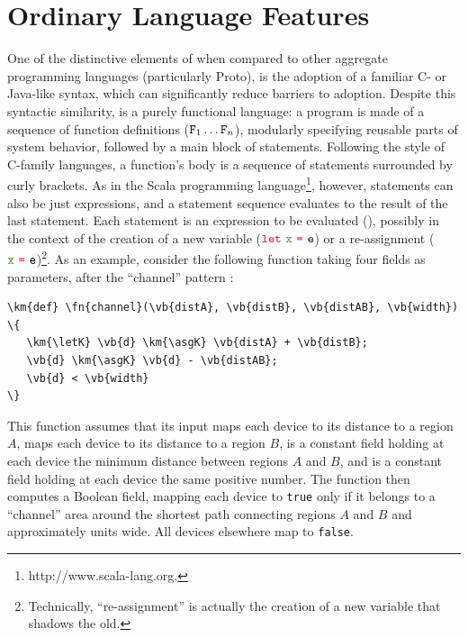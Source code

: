 \documentclass[12pt,a4paper,twoside,openright]{book}
\begin{document}
\section{Ordinary Language Features}

One of the distinctive elements of \protelis{} when compared to other aggregate programming languages (particularly Proto), is the adoption of a familiar C- or Java-like syntax, which can significantly reduce barriers to adoption.
%
Despite this syntactic similarity, \protelis{} is a purely functional language: a program is made of a sequence of function definitions ($\texttt{F}_1\ldots\texttt{F}_n$), modularly specifying reusable parts of system behavior, followed by a main block of statements.
%
Following the style of C-family languages, a function's body is a sequence of statements surrounded by curly brackets.  As in the Scala programming language\footnote{http://www.scala-lang.org.}, however, statements can also be just expressions, and a statement sequence evaluates to the result of the last statement.
%
Each statement is an expression to be evaluated (\e), possibly in the context of the creation of a new variable ($\km{\letK} \vb{\var} \km{\asgK} \e$) or a re-assignment ($\vb{\var} \km{\asgK} \e$)\footnote{Technically, ``re-assignment'' is actually the creation of a new variable that shadows the old.}.
%
As an example, consider the following function taking four fields as parameters, after the ``channel'' pattern \cite{butera}:
\begin{center}
\begin{Verbatim}[samepage=true, frame=single, commandchars=\\\{\}]
\km{def} \fn{channel}(\vb{distA}, \vb{distB}, \vb{distAB}, \vb{width}) \{
   \km{\letK} \vb{d} \km{\asgK} \vb{distA} + \vb{distB};
   \vb{d} \km{\asgK} \vb{d} - \vb{distAB};
   \vb{d} < \vb{width}
\}
\end{Verbatim}
\end{center}
This function assumes that its input \texttt{} maps each device to its distance to a region $A$, \texttt{} maps each device to its distance to a region $B$, \texttt{} is a constant field holding at each device the minimum distance between regions $A$ and $B$, and \texttt{} is a constant field holding at each device the same positive number.
%
The function then computes a Boolean field, mapping each device to \texttt{true} only if it belongs to a ``channel'' area around the shortest path connecting regions $A$ and $B$ and approximately \texttt{} units wide.
%
All devices elsewhere map to \texttt{false}.
\end{document}
